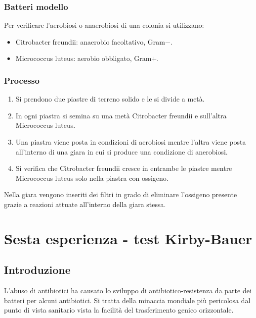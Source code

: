 		\subsubsection{Batteri modello}
		Per verificare l'aerobiosi o anaerobiosi di una colonia si utilizzano:
		\begin{multicols}{2}
			\begin{itemize}
				\item Citrobacter freundii: anaerobio facoltativo, Gram$-$.
				\item Micrococcus luteus: aerobio obbligato, Gram$+$.
			\end{itemize}
		\end{multicols}

		\subsubsection{Processo}
		\begin{enumerate}
			\item Si prendono due piastre di terreno solido e le si divide a met\`a.
			\item In ogni piastra si semina su una met\`a Citrobacter freundii e sull'altra Micrococcus luteus.
			\item Una piastra viene posta in condizioni di aerobiosi mentre l'altra viene posta all'interno di una giara in cui si produce una condizione di anerobiosi.
			\item Si verifica che Citrobacter freundii cresce in entrambe le piastre mentre Micrococcus luteus solo nella piastra con ossigeno.
		\end{enumerate}
		Nella giara vengono inseriti dei filtri in grado di eliminare l'ossigeno presente grazie a reazioni attuate all'interno della giara stessa.
		
\section{Sesta esperienza - test Kirby-Bauer}

	\subsection{Introduzione}
	L'abuso di antibiotici ha causato lo sviluppo di antibiotico-resistenza da parte dei batteri per alcuni antibiotici.
	Si tratta della minaccia mondiale pi\`u pericolosa dal punto di vista sanitario vista la facilit\`a del trasferimento genico orizzontale.
	
